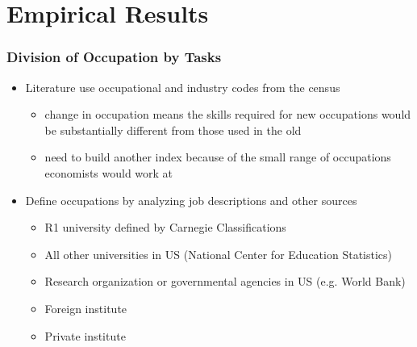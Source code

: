 \documentclass[10pt,svgnames,fragile]{beamer}
\begin{document}
{
	\AtBeginSection{}
	\section{Empirical Results}
	\begin{frame}
		\frametitle{Division of Occupation by Tasks}
		\begin{itemize}
			\item Literature use occupational and industry codes from the census
			\begin{itemize}
				\vspace{1.5 mm}
				\item change in occupation means the skills required for new occupations would be substantially different from those used in the old 
				\vspace{1.5 mm}
				\item need to build another index because of the small range of occupations economists would work at
			\end{itemize}
			\vfill
			\item Define occupations  by analyzing job descriptions and other sources
			\begin{itemize}
				\vspace{1.5 mm}
				\item R1 university defined by {\small Carnegie Classifications}
				\vspace{1.5 mm}
				\item All other universities in US (National Center for Education Statistics)
				\vspace{1.5 mm}
				\item Research organization or governmental agencies in US (e.g. World Bank)
				\vspace{1.5 mm}
				\item Foreign institute
				\vspace{1.5 mm}
				\item Private institute\\
				\vspace{1.5 mm}
			
			\end{itemize}
			\vfill
		\end{itemize}
	\end{frame}
	
}
\end{document}
